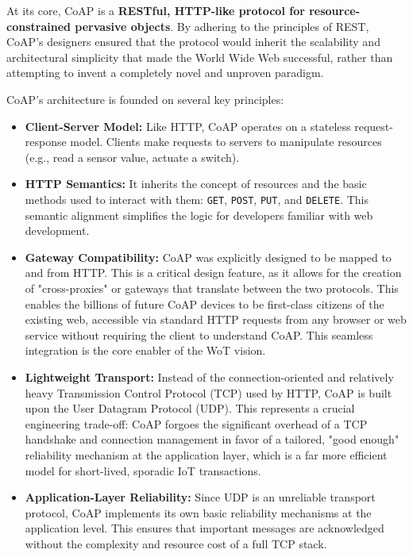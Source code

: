 \documentclass{scrbook}
\begin{document}
At its core, CoAP is a \textbf{RESTful, HTTP-like protocol for resource-constrained pervasive objects}. By adhering to the principles of REST, CoAP's designers ensured that the protocol would inherit the scalability and architectural simplicity that made the World Wide Web successful, rather than attempting to invent a completely novel and unproven paradigm.

CoAP's architecture is founded on several key principles:

\begin{itemize}
    \item \textbf{Client-Server Model:} Like HTTP, CoAP operates on a stateless request-response model. Clients make requests to servers to manipulate resources (e.g., read a sensor value, actuate a switch).
    \item \textbf{HTTP Semantics:} It inherits the concept of resources and the basic methods used to interact with them: \texttt{GET}, \texttt{POST}, \texttt{PUT}, and \texttt{DELETE}. This semantic alignment simplifies the logic for developers familiar with web development.
    \item \textbf{Gateway Compatibility:} CoAP was explicitly designed to be mapped to and from HTTP. This is a critical design feature, as it allows for the creation of "cross-proxies" or gateways that translate between the two protocols. This enables the billions of future CoAP devices to be first-class citizens of the existing web, accessible via standard HTTP requests from any browser or web service without requiring the client to understand CoAP. This seamless integration is the core enabler of the WoT vision.
    \item \textbf{Lightweight Transport:} Instead of the connection-oriented and relatively heavy Transmission Control Protocol (TCP) used by HTTP, CoAP is built upon the User Datagram Protocol (UDP). This represents a crucial engineering trade-off: CoAP forgoes the significant overhead of a TCP handshake and connection management in favor of a tailored, "good enough" reliability mechanism at the application layer, which is a far more efficient model for short-lived, sporadic IoT transactions.
    \item \textbf{Application-Layer Reliability:} Since UDP is an unreliable transport protocol, CoAP implements its own basic reliability mechanisms at the application level. This ensures that important messages are acknowledged without the complexity and resource cost of a full TCP stack.
\end{itemize}
\end{document}

